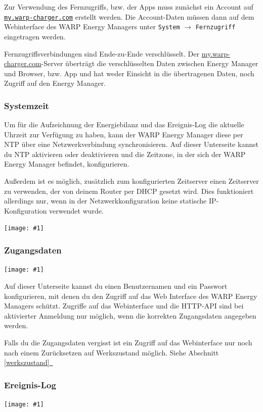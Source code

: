 \documentclass[a4paper,10pt]{article}
\newcommand{\hint}[1]{\begin{tcolorbox}[colback=boxgray,colframe=black,coltext=
white,title=Hinweis,left*=2mm,right*=2mm,boxsep=1mm,bottom=1mm,top=1mm]#1\end{tcolorbox}}
\newcommand{\gfx}[1]{\texttt{[image: \#1]}}
\newcommand*{\fullref}[1]{Abschnitt \hyperref[{#1}]{\ref*{#1}~\nameref*{#1}}}
\newcommand\rurl[2]{%
  \href{#1}{\nolinkurl{#2}}%
}
\begin{document}
\begin{multicols*}{2}
    Zur Verwendung des Fernzugriffs, bzw. der Apps muss zunächst ein Account auf \rurl{https://my.warp-charger.com}{my.warp-charger.com} erstellt werden. Die Account-Daten müssen dann auf dem Webinterface des WARP Energy Managers unter \texttt{System} $\rightarrow$ \texttt{Fernzugriff} eingetragen werden.


    \hint{Fernzugriffsverbindungen sind Ende-zu-Ende verschlüsselt. Der \url{my.warp-charger.com}-Server überträgt die verschlüsselten Daten zwischen Energy Manager und Browser, bzw. App und hat weder Einsicht in die übertragenen Daten, noch Zugriff auf den Energy Manager.}


	\subsubsection{Systemzeit}\label{ntp}
	Um für die Aufzeichnung der Energiebilanz und das Ereignis-Log die aktuelle Uhrzeit zur
	Verfügung zu haben, kann der WARP Energy Manager diese per NTP über
	eine Netzwerkverbindung synchronisieren. Auf dieser Unterseite kannst du NTP aktivieren oder deaktivieren und die Zeitzone, in der sich der WARP Energy Manager befindet, konfigurieren.

	Außerdem ist es möglich, zusätzlich zum konfigurierten Zeitserver einen Zeitserver zu verwenden, der von deinem Router per DHCP gesetzt wird. Dies funktioniert allerdings nur,
	wenn in der Netzwerkkonfiguration keine statische IP-Konfiguration verwendet wurde.

	\gfx{./img/resized/web_ntp}


	\subsubsection{Zugangsdaten}

	\gfx{./img/resized/web_authentication.png}

	Auf dieser Unterseite kannst du einen Benutzernamen und ein Passwort konfigurieren, mit denen du den Zugriff auf das Web Interface
	des WARP Energy Managers schützt. Zugriffe auf das Webinterface und die HTTP-API sind bei aktivierter Anmeldung nur möglich, wenn
	die korrekten Zugangsdaten angegeben werden.
	\hint{Falls du die Zugangsdaten vergisst ist ein Zugriff auf das Webinterface nur noch nach einem Zurücksetzen auf Werkszustand möglich. Siehe \fullref{werkszustand}}

	\subsubsection{Ereignis-Log}
	\gfx{./img/resized/web_event_log}


\end{multicols*}
\end{document}
